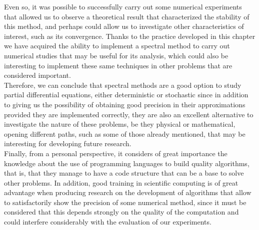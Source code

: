 	Even so, it was possible to successfully carry out some numerical experiments that allowed us to observe a theoretical result that characterized the stability of this method, and perhaps could allow us to investigate other characteristics of interest, such as its convergence. Thanks to the practice developed in this chapter we have acquired the ability to implement a spectral method to carry out numerical studies that may be useful for its analysis, which could also be interesting to implement these same techniques in other problems that are considered important. \\
	
	Therefore, we can conclude that spectral methods are a good option to study partial differential equations, either deterministic or stochastic since in addition to giving us the possibility of obtaining good precision in their approximations provided they are implemented correctly, they are also an excellent alternative to investigate the nature of these problems, be they physical or mathematical, opening different paths, such as some of those already mentioned, that may be interesting for developing future research. \\
	
	Finally, from a personal perspective, it considers of great importance the knowledge about the use of programming languages to build quality algorithms, that is, that they manage to have a code structure that can be a base to solve other problems. In addition, good training in scientific computing is of great advantage when producing research on the development of algorithms that allow to satisfactorily show the precision of some numerical method, since it must be considered that this depends strongly on the quality of the computation and could interfere considerably with the evaluation of our experiments. 
	
	
	